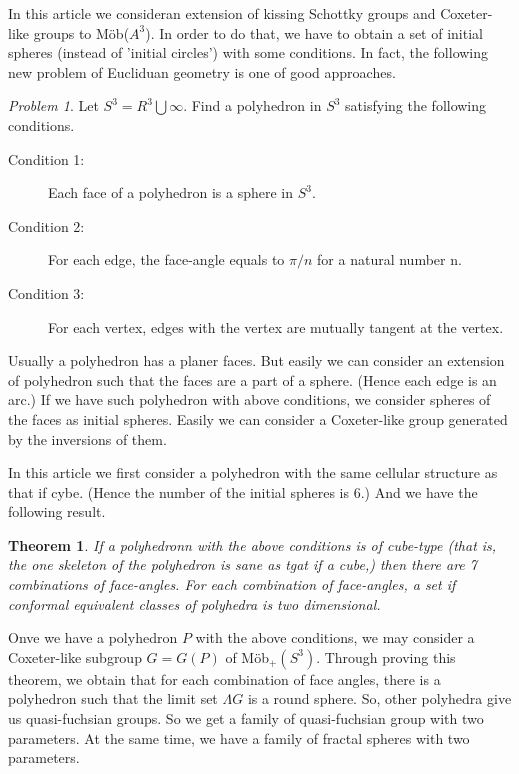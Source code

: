 \documentclass[dvipdfmx]{interact}
\theoremstyle{plain}%
\newtheorem{theorem}{Theorem}[section]
\theoremstyle{definition}
\theoremstyle{remark}
\theoremstyle{problemstyle}
\newtheorem{problem}{Problem}[section] %
\begin{document}
In this article we consideran extension of kissing Schottky groups and
Coxeter-like groups to M\"ob($A^3$). In order to do that, we have to
obtain a set of initial spheres (instead of 'initial circles') with some
conditions. In fact, the following new problem of Eucliduan geometry is
one of good approaches.

\begin{problem}
 Let $S^3 = R^3 \bigcup {\infty}$. Find a polyhedron in $S^3$ satisfying
 the following conditions.
 \begin{description}
  \item[Condition 1:] Each face of a polyhedron is a sphere in $S^3$.
  \item[Condition 2:] For each edge, the face-angle equals to $\pi/n$
             for a natural number n.
  \item[Condition 3:] For each vertex, edges with the vertex are
             mutually tangent at the vertex.
 \end{description}
\end{problem}

Usually a polyhedron has a planer faces. But easily we can consider an
extension of polyhedron such that the faces are a part of a
sphere. (Hence each edge is an arc.) If we have such polyhedron with
above conditions, we consider spheres of the faces as initial
spheres. Easily we can consider a Coxeter-like group generated by the
inversions of them.

In this article we first consider a polyhedron with the same cellular
structure as that if cybe. (Hence the number of the initial spheres is
6.) And we have the following result.

\begin{theorem}
 If a polyhedronn with the above conditions is of cube-type (that is,
 the one skeleton of the polyhedron is sane as tgat if a cube,) then
 there are 7 combinations of face-angles. For each combination of
 face-angles, a set if conformal equivalent classes of polyhedra is two
 dimensional.
\end{theorem}

Onve we have a polyhedron $P$ with the above conditions, we may consider
a Coxeter-like subgroup $G=G(P)$ of M\"ob$_+(S^3)$. Through proving this
theorem, we obtain that for each combination of face angles, there is a
polyhedron such that the limit set $\Lambda{G}$ is a round sphere. So,
other polyhedra give us quasi-fuchsian groups. So we get a family of
quasi-fuchsian group with two parameters. At the same time, we have a
family of fractal spheres with two parameters.
\end{document}

